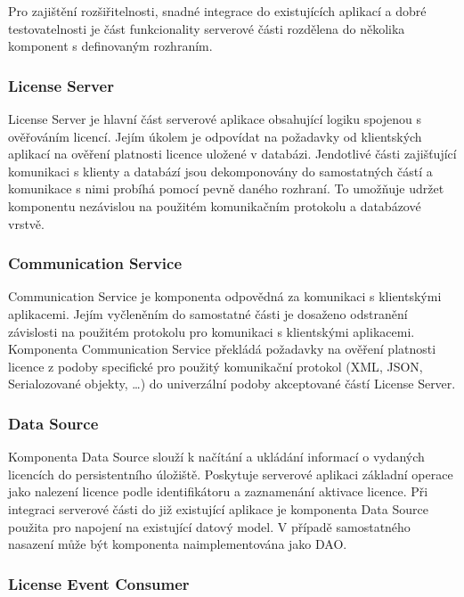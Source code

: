 Pro zajištění rozšiřitelnosti, snadné integrace do existujících aplikací a dobré
testovatelnosti je část funkcionality serverové části rozdělena do několika
komponent s definovaným rozhraním.

\subsubsection*{License Server}

License Server je hlavní část serverové aplikace obsahující logiku spojenou s
ověřováním licencí. Jejím úkolem je odpovídat na požadavky od klientských aplikací na
ověření platnosti licence uložené v databázi. Jendotlivé části zajišťující
komunikaci s klienty a databází jsou dekomponovány do samostatných částí a
komunikace s nimi probíhá pomocí pevně daného rozhraní. To umožňuje udržet
komponentu nezávislou na použitém komunikačním protokolu a databázové vrstvě.

\subsubsection*{Communication Service}

Communication Service je komponenta odpovědná za komunikaci s klientskými
aplikacemi. Jejím vyčleněním do samostatné části je dosaženo odstranění
závislosti na použitém protokolu pro komunikaci s klientskými aplikacemi.
Komponenta Communication Service překládá požadavky na ověření platnosti licence
z podoby specifické pro použitý komunikační protokol (\gls{XML}, \gls{JSON},
Serialozované objekty, \ldots) do univerzální podoby akceptované částí License Server.

\subsubsection*{Data Source}

Komponenta Data Source slouží k načítání a ukládání informací o vydaných
licencích do persistentního úložiště. Poskytuje serverové aplikaci základní operace jako
nalezení licence podle identifikátoru a zaznamenání aktivace licence. Při
integraci serverové části do již existující aplikace je komponenta Data Source
použita pro napojení na existující datový model. V případě samostatného nasazení
může být komponenta naimplementována jako \gls{DAO}.

\subsubsection*{License Event Consumer}

